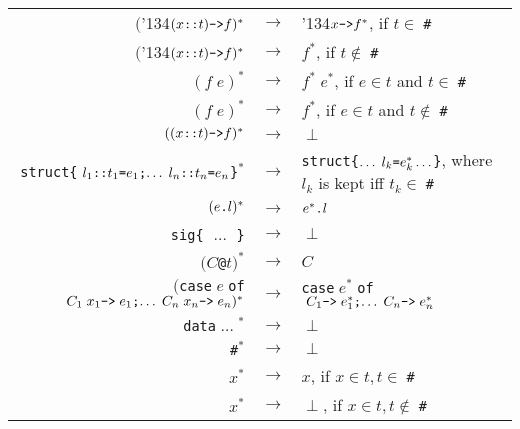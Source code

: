 \documentclass[17pt]{foils} %
\newcommand{\te}[1]{{\tt #1}}
\newcommand\bs{\char '134}  %
\begin{document}
\rsep
{}
    {\judge{\Gamma}{\hastype{e}{\;$\te{sig\{}$\; \ldots l_i \dc A_i \gamma_i \sm \ldots $\te{\}}$\;}}}
    {}

\rsep

    { \seph
      \seph
     }
    {}
\rsep
{}
    { \seph
     \judge{\Gamma}{\delta}}
    {}
\rsep
{}
    { \seph
     }
    {}
\rsep

\newpage
{}

\begin{tabular}{rcl}
$($\bs$(x\dc t)\fun f)^*$ & $\rightarrow$ & \bs$x\fun f^*$, if $t\in\;$\te{\#} \\
$($\bs$(x\dc t)\fun f)^*$ & $\rightarrow$ & $f^*$, if $t\notin\;$\te{\#}  \\
$(f\;e)^*$ & $\rightarrow$ & $f^*\;e^*$, if $e\in t$ and $t\in\;$\te{\#} \\
$(f\;e)^*$ & $\rightarrow$ & $f^*$, if $e\in t$ and $t\notin\;$\te{\#} \\
$((x\dc t)\fun f)^*$ & $\rightarrow$ & $\perp$ \\

\te{struct\{}$\;l_1\dc t_1\teq e_1\sm \ldots\;l_n\dc t_n\teq e_n$\te{\}}$^*$ & $\rightarrow$ 
        & \te{struct\{}$\ldots\;l_k\teq e_k^*\ldots$\te{\}}, where $l_k$ is kept iff $t_k\in\;$\te{\#} \\
$(e\dt l)^*$ & $\rightarrow$ & $e^*\dt l$ \\
\te{sig\{} $\;\ldots\;$ \te{\}} & $\rightarrow$ & $\perp$ \\

$(C$\te{@}$t)^*$ & $\rightarrow$ & $C$ \\
$($\te{case}$\;e\;$\te{of}$\;C_1\;x_1\fun \;e_1\sm \ldots\;C_n\;x_n\fun \;e_n)^*$ & $\rightarrow$ 
        & \te{case}$\;e^*\;$\te{of}$\;C_1\fun \;e_1^*\sm \ldots\;C_n\fun \;e_n^*$ \\
\te{data}$\;\ldots\;^*$ & $\rightarrow$ & $\perp$ \\

\te{\#}$^*$ & $\rightarrow$ & $\perp$ \\
$x^*$ & $\rightarrow$ & $x$, if $x\in t, t\in\;$\te{\#} \\
$x^*$ & $\rightarrow$ & $\perp$, if $x\in t, t\notin\;$\te{\#} \\

\end{tabular}
\end{document}
